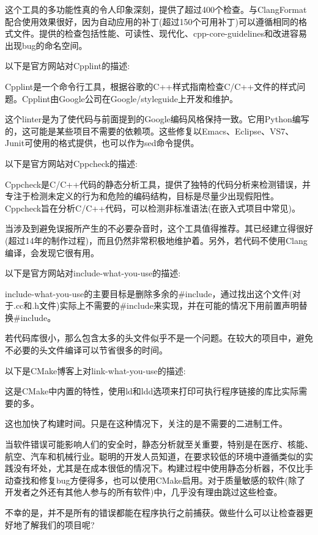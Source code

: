 这个工具的多功能性真的令人印象深刻，提供了超过400个检查。与ClangFormat配合使用效果很好，因为自动应用的补丁(超过150个可用补丁)可以遵循相同的格式文件。提供的检查包括性能、可读性、现代化、cpp-core-guidelines和改进容易出现bug的命名空间。



以下是官方网站对Cpplint的描述:

Cpplint是一个命令行工具，根据谷歌的C++样式指南检查C/C++文件的样式问题。Cpplint由Google公司在Google/styleguide上开发和维护。

这个linter是为了使代码与前面提到的Google编码风格保持一致。它用Python编写的，这可能是某些项目不需要的依赖项。这些修复以Emacs、Eclipse、VS7、Junit可使用的格式提供，也可以作为sed命令提供。


以下是官方网站对Cppcheck的描述:

Cppcheck是C/C++代码的静态分析工具，提供了独特的代码分析来检测错误，并专注于检测未定义的行为和危险的编码结构，目标是尽量少出现假阳性。Cppcheck旨在分析C/C++代码，可以检测非标准语法(在嵌入式项目中常见)。

当涉及到避免误报所产生的不必要杂音时，这个工具值得推荐。其已经建立得很好(超过14年的制作过程)，而且仍然非常积极地维护着。另外，若代码不使用Clang编译，会发现它很有用。



以下是官方网站对include-what-you-use的描述:

include-what-you-use的主要目标是删除多余的\#include，通过找出这个文件(对于.cc和.h文件)实际上不需要的\#include来实现，并在可能的情况下用前置声明替换\#include。

若代码库很小，那么包含太多的头文件似乎不是一个问题。在较大的项目中，避免不必要的头文件编译可以节省很多的时间。


以下是CMake博客上对link-what-you-use的描述:

这是CMake中内置的特性，使用ld和ldd选项来打印可执行程序链接的库比实际需要的多。

这也加快了构建时间。只是在这种情况下，关注的是不需要的二进制工件。

当软件错误可能影响人们的安全时，静态分析就至关重要，特别是在医疗、核能、航空、汽车和机械行业。聪明的开发人员知道，在要求较低的环境中遵循类似的实践没有坏处，尤其是在成本很低的情况下。构建过程中使用静态分析器，不仅比手动查找和修复bug方便得多，也可以使用CMake启用。对于质量敏感的软件(除了开发者之外还有其他人参与的所有软件)中，几乎没有理由跳过这些检查。

不幸的是，并不是所有的错误都能在程序执行之前捕获。做些什么可以让检查器更好地了解我们的项目呢?



